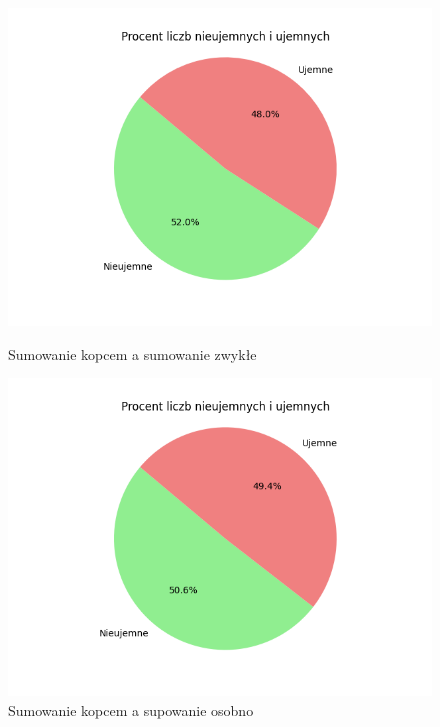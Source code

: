 \documentclass[12pt,a4paper]{article}
\begin{document}
\begin{figure}[!htb]
    \centering
    \begin{minipage}{.45\textwidth}
        \centering
        \includegraphics[width=\linewidth]{images/h2h5.png}
        \caption{Sumowanie kopcem a sumowanie zwykłe}
        \label{fig:h2h5}
    \end{minipage}\hfill
    \begin{minipage}{.45\textwidth}
        \centering
        \includegraphics[width=\linewidth]{images/h3h5.png}
        \caption{Sumowanie kopcem a supowanie osobno}
        \label{fig:h3h5}
    \end{minipage}
\end{figure}
\end{document}
